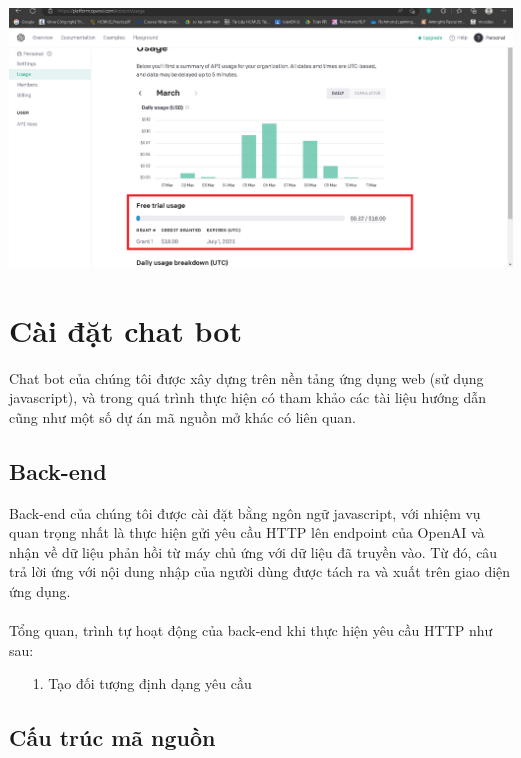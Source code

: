 \documentclass[a4paper, 12pt]{article}
\begin{document}
\begin{itemize}
\begin{centering}
		\includegraphics[width = 170mm]{4.5.png}
	\end{centering}
	\end{itemize}
	
	\section{Cài đặt chat bot}
	Chat bot của chúng tôi được xây dựng trên nền tảng ứng dụng web (sử dụng javascript), và trong quá trình thực hiện có tham khảo các tài liệu hướng dẫn cũng như một số dự án mã nguồn mở khác có liên quan.
	\subsection{Back-end}
	Back-end của chúng tôi được cài đặt bằng ngôn ngữ javascript, với nhiệm vụ quan trọng nhất là thực hiện gửi yêu cầu HTTP lên endpoint của OpenAI và nhận về dữ liệu phản hồi từ máy chủ  ứng với dữ liệu đã truyền vào. Từ đó, câu trả lời ứng với nội dung nhập của người dùng được tách ra và xuất trên giao diện ứng dụng.
	\\
	\\
	Tổng quan, trình tự hoạt động của back-end khi thực hiện yêu cầu HTTP như sau:
	\begin{itemize}
		\item[1.] Tạo đối tượng  định dạng yêu cầu
	\end{itemize}
	
	
	\subsection{Cấu trúc mã nguồn}
	
	
\end{document}
